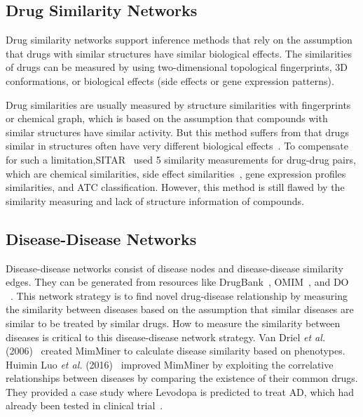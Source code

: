 \subsection{Drug Similarity Networks}

Drug similarity networks support inference methods that rely on the assumption that drugs with similar structures have similar biological effects. The similarities of drugs can be measured by using two-dimensional topological fingerprints, 3D conformations, or biological effects (side effects or gene expression patterns).

Drug similarities are usually measured by structure similarities with fingerprints~\cite{willett_similarity-based_2006} or chemical graph, which is based on the assumption that compounds with similar structures have similar activity. But this method suffers from that drugs similar in structures often have very different biological effects~\cite{stumpfe_exploring_2012}. To compensate for such a limitation,\ac{SITAR}~\cite{perlman_combining_2011} used 5 similarity measurements for drug-drug pairs, which are chemical similarities, side effect similarities~\cite{kuhn_stitch:_2008}, gene expression profiles similarities, and \ac{ATC} classification. However, this method is still flawed by the similarity measuring and lack of structure information of compounds. 

\subsection{Disease-Disease Networks}

Disease-disease networks consist of disease nodes and disease-disease similarity edges. They can be generated from resources like DrugBank~\cite{law_drugbank_2014}, \ac{OMIM}~\cite{hamosh_online_2005}, and \ac{DO} ~\cite{schriml_disease_2012}. This network strategy is to find novel drug-disease relationship by measuring the similarity between diseases based on the assumption that similar diseases are similar to be treated by similar drugs. How to measure the similarity between diseases is critical to this disease-disease network strategy. Van Driel \textit{et al.} (2006)~\cite{van_driel_text-mining_2006} created MimMiner to calculate disease similarity based on phenotypes. Huimin Luo \textit{et al.} (2016)~\cite{luo_drug_2016} improved MimMiner by exploiting the correlative relationships between diseases by comparing the existence of their common drugs. They provided a case study where Levodopa is predicted to treat \ac{AD}, which had already been tested in clinical trial~\cite{noauthor_clinicaltrials.gov_nodate}.

